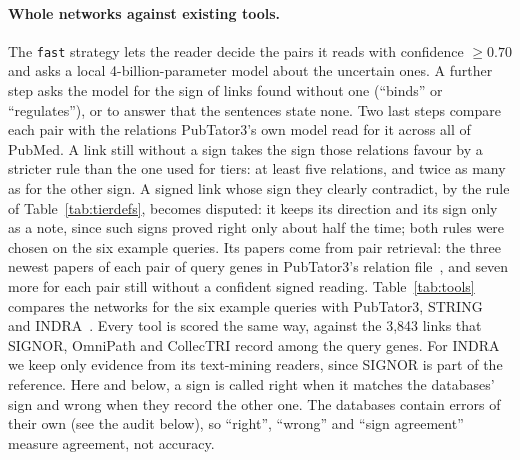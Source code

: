 \documentclass[11pt,a4paper]{article}
\newcommand{\code}[1]{\texttt{#1}}
\begin{document}
\paragraph{Whole networks against existing tools.} The \code{fast} strategy lets the reader decide
the pairs it reads with confidence $\geq 0.70$ and asks a local 4-billion-parameter model about the
uncertain ones. A further step asks the model for the sign of links found without one (``binds'' or
``regulates''), or to answer that the sentences state none. Two last steps compare each pair with
the relations PubTator3's own model read for it across all of PubMed. A link still without a sign
takes the sign those relations favour by a stricter rule than the one used for tiers: at least
five relations, and twice as many as for the other sign. A signed link whose sign they clearly
contradict, by the rule of Table~\ref{tab:tierdefs}, becomes disputed: it keeps its direction and
its sign only as a note, since such signs proved
right only about half the time; both rules were chosen on the six example queries. Its papers come
from pair retrieval: the three newest
papers of each pair of query genes in PubTator3's relation file~\cite{pubtator3}, and seven more for
each pair still without a confident signed reading. Table~\ref{tab:tools} compares the networks
for the six example queries with PubTator3, STRING~\cite{string} and INDRA~\cite{indra2023}. Every
tool is scored the same way, against the 3,843 links that SIGNOR, OmniPath and CollecTRI record
among the query genes. For INDRA we keep only evidence from its text-mining readers, since SIGNOR
is part of the reference. Here and below, a sign is called right when it matches the databases'
sign and wrong when they record the other one. The databases contain errors of their own (see the
audit below), so ``right'', ``wrong'' and ``sign agreement'' measure agreement, not accuracy.
\end{document}
